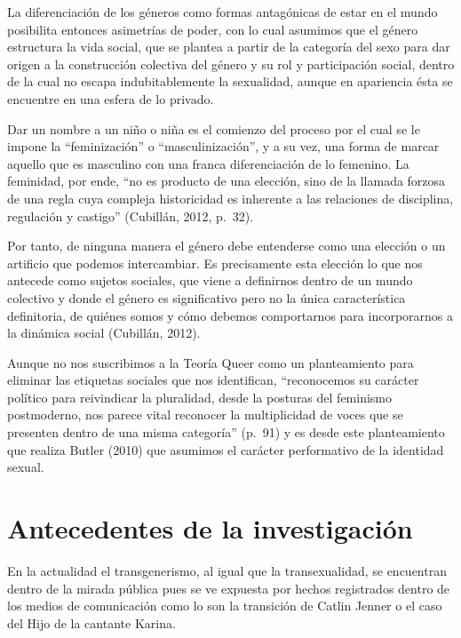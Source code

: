 La diferenciación de los géneros como formas antagónicas de estar en el mundo
posibilita entonces asimetrías de poder, con lo cual asumimos que el género
estructura la vida social, que se plantea a partir de la categoría del sexo para
dar origen a la construcción colectiva del género y su rol y participación
social, dentro de la cual no escapa indubitablemente la sexualidad, aunque en
apariencia ésta se encuentre en una esfera de lo privado.

Dar un nombre a un niño o niña es el comienzo del proceso por el cual se le
impone la “feminización” o “masculinización”, y a su vez, una forma de marcar
aquello que es masculino con una franca diferenciación de lo femenino.
La feminidad, por ende, “no es producto de una elección, sino de la llamada
forzosa de una regla cuya compleja historicidad es inherente a las relaciones de
disciplina, regulación y castigo” (Cubillán, 2012, p.~32).

Por tanto, de ninguna manera el género debe entenderse como una elección o un
artificio que podemos intercambiar.
Es precisamente esta elección lo que nos antecede como sujetos sociales, que
viene a definirnos dentro de un mundo colectivo y donde el género es
significativo pero no la única característica definitoria, de quiénes somos y
cómo debemos comportarnos para incorporarnos a la dinámica social (Cubillán,
2012).

Aunque no nos suscribimos a la Teoría Queer como un planteamiento para eliminar
las etiquetas sociales que nos identifican, “reconocemos su carácter político
para reivindicar la pluralidad, desde la posturas del feminismo postmoderno, nos
parece vital reconocer la multiplicidad de voces que se presenten dentro de
una misma categoría” (p.~91) y es desde este planteamiento que realiza Butler
(2010) que asumimos el carácter performativo de la identidad sexual.

\section{Antecedentes de la investigación}
En la actualidad el transgenerismo, al igual que la transexualidad, se encuentran
dentro de la mirada pública pues se ve expuesta por hechos registrados dentro de
los medios de comunicación como lo son la transición de Catlin Jenner o el caso
del Hijo de la cantante Karina.

